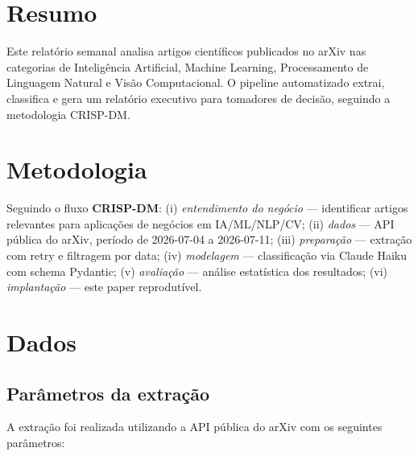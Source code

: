 \documentclass[
  brazilian,
  11pt,
  letterpaper,
  DIV=11,
  numbers=noendperiod]{scrartcl}
\begin{document}
\section{Resumo}\label{resumo}

Este relatório semanal analisa artigos científicos publicados no arXiv
nas categorias de Inteligência Artificial, Machine Learning,
Processamento de Linguagem Natural e Visão Computacional. O pipeline
automatizado extrai, classifica e gera um relatório executivo para
tomadores de decisão, seguindo a metodologia CRISP-DM.

\section{Metodologia}\label{metodologia}

Seguindo o fluxo \textbf{CRISP-DM}: (i) \emph{entendimento do negócio}
--- identificar artigos relevantes para aplicações de negócios em
IA/ML/NLP/CV; (ii) \emph{dados} --- API pública do arXiv, período de
2026-07-04 a 2026-07-11; (iii) \emph{preparação} --- extração com retry
e filtragem por data; (iv) \emph{modelagem} --- classificação via Claude
Haiku com schema Pydantic; (v) \emph{avaliação} --- análise estatística
dos resultados; (vi) \emph{implantação} --- este paper reprodutível.

\section{Dados}\label{dados}

\subsection{Parâmetros da
extração}\label{paruxe2metros-da-extrauxe7uxe3o}

A extração foi realizada utilizando a API pública do arXiv com os
seguintes parâmetros:
\end{document}
